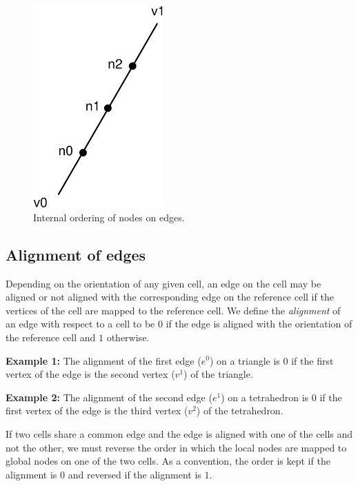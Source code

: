 \begin{figure}[htbp]
  \begin{center}
    \includegraphics[width=5cm]{eps/edge_ordering.eps}
    \caption{Internal ordering of nodes on edges.}
    \label{fig:ordering,edges}
  \end{center}
\end{figure}

\subsection{Alignment of edges}

Depending on the orientation of any given cell, an edge on the cell
may be aligned or not aligned with the corresponding edge on the
reference cell if the vertices of the cell are mapped to the reference
cell. We define the \emph{alignment} of an edge with respect to a
cell to be $0$ if the edge is aligned with the orientation of the
reference cell and $1$ otherwise.

\textbf{Example 1:} The alignment of the first edge ($e^0$) on a
triangle is $0$ if the first vertex of the edge is the second vertex ($v^1$)
of the triangle.

\textbf{Example 2:} The alignment of the second edge ($e^1$) on a
tetrahedron is $0$ if the first vertex of the edge is the third vertex
($v^2$) of the tetrahedron.

If two cells share a common edge and the edge is aligned with one of
the cells and not the other, we must reverse the order in which the
local nodes are mapped to global nodes on one of the two cells. As a
convention, the order is kept if the alignment is $0$ and reversed if
the alignment is $1$.

